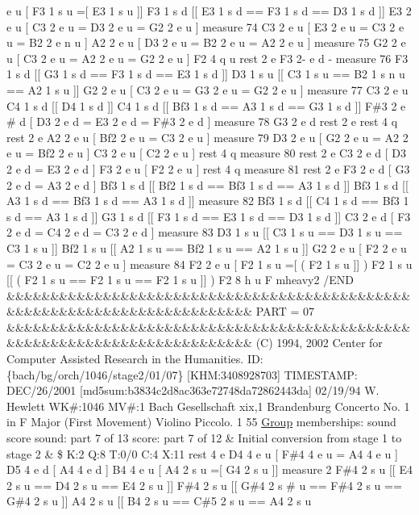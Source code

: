 e u \mbox{[} F3 1 s u =\mbox{[} E3 1 s u \mbox{]}\mbox{]} F3 1 s d \mbox{[}\mbox{[} E3 1 s d == F3 1 s d == D3 1 s d \mbox{]}\mbox{]} E3 2 e u \mbox{[} C3 2 e u = D3 2 e u = G2 2 e u \mbox{]} measure 74 C3 2 e u \mbox{[} E3 2 e u = C3 2 e u = B2 2 e n u \mbox{]} A2 2 e u \mbox{[} D3 2 e u = B2 2 e u = A2 2 e u \mbox{]} measure 75 G2 2 e u \mbox{[} C3 2 e u = A2 2 e u = G2 2 e u \mbox{]} F2 4 q u rest 2 e F3 2-\/ e d -\/ measure 76 F3 1 s d \mbox{[}\mbox{[} G3 1 s d == F3 1 s d == E3 1 s d \mbox{]}\mbox{]} D3 1 s u \mbox{[}\mbox{[} C3 1 s u == B2 1 s n u == A2 1 s u \mbox{]}\mbox{]} G2 2 e u \mbox{[} C3 2 e u = G3 2 e u = G2 2 e u \mbox{]} measure 77 C3 2 e u C4 1 s d \mbox{[}\mbox{[} D4 1 s d \mbox{]}\mbox{]} C4 1 s d \mbox{[}\mbox{[} Bf3 1 s d == A3 1 s d == G3 1 s d \mbox{]}\mbox{]} F\#3 2 e \# d \mbox{[} D3 2 e d = E3 2 e d = F\#3 2 e d \mbox{]} measure 78 G3 2 e d rest 2 e rest 4 q rest 2 e A2 2 e u \mbox{[} Bf2 2 e u = C3 2 e u \mbox{]} measure 79 D3 2 e u \mbox{[} G2 2 e u = A2 2 e u = Bf2 2 e u \mbox{]} C3 2 e u \mbox{[} C2 2 e u \mbox{]} rest 4 q measure 80 rest 2 e C3 2 e d \mbox{[} D3 2 e d = E3 2 e d \mbox{]} F3 2 e u \mbox{[} F2 2 e u \mbox{]} rest 4 q measure 81 rest 2 e F3 2 e d \mbox{[} G3 2 e d = A3 2 e d \mbox{]} Bf3 1 s d \mbox{[}\mbox{[} Bf2 1 s d == Bf3 1 s d == A3 1 s d \mbox{]}\mbox{]} Bf3 1 s d \mbox{[}\mbox{[} A3 1 s d == Bf3 1 s d == A3 1 s d \mbox{]}\mbox{]} measure 82 Bf3 1 s d \mbox{[}\mbox{[} C4 1 s d == Bf3 1 s d == A3 1 s d \mbox{]}\mbox{]} G3 1 s d \mbox{[}\mbox{[} F3 1 s d == E3 1 s d == D3 1 s d \mbox{]}\mbox{]} C3 2 e d \mbox{[} F3 2 e d = C4 2 e d = C3 2 e d \mbox{]} measure 83 D3 1 s u \mbox{[}\mbox{[} C3 1 s u == D3 1 s u == C3 1 s u \mbox{]}\mbox{]} Bf2 1 s u \mbox{[}\mbox{[} A2 1 s u == Bf2 1 s u == A2 1 s u \mbox{]}\mbox{]} G2 2 e u \mbox{[} F2 2 e u = C3 2 e u = C2 2 e u \mbox{]} measure 84 F2 2 e u \mbox{[} F2 1 s u =\mbox{[} ( F2 1 s u \mbox{]}\mbox{]} ) F2 1 s u \mbox{[}\mbox{[} ( F2 1 s u == F2 1 s u == F2 1 s u \mbox{]}\mbox{]} ) F2 8 h u F mheavy2 /\+E\+ND \&\&\&\&\&\&\&\&\&\&\&\&\&\&\&\&\&\&\&\&\&\&\&\&\&\&\&\&\&\&\&\&\&\&\&\&\&\&\&\&\&\&\&\&\&\&\&\&\&\&\&\&\&\&\&\&\&\&\&\&\&\&\&\&\&\&\&\&\&\&\&\&\&\& P\+A\+RT = 07 \&\&\&\&\&\&\&\&\&\&\&\&\&\&\&\&\&\&\&\&\&\&\&\&\&\&\&\&\&\&\&\&\&\&\&\&\&\&\&\&\&\&\&\&\&\&\&\&\&\&\&\&\&\&\&\&\&\&\&\&\&\&\&\&\&\&\&\&\&\&\&\&\&\& (C) 1994, 2002 Center for Computer Assisted Research in the Humanities. ID\+: \{bach/bg/orch/1046/stage2/01/07\} \mbox{[}K\+HM\+:3408928703\mbox{]} T\+I\+M\+E\+S\+T\+A\+MP\+: D\+E\+C/26/2001 \mbox{[}md5sum\+:b3834c2d8ac363e72748da72862443da\mbox{]} 02/19/94 W. Hewlett WK\#\+:1046 MV\#\+:1 Bach Gesellschaft xix,1 Brandenburg Concerto No. 1 in F Major (First Movement) Violino Piccolo. 1 55 \hyperlink{class_group}{Group} memberships\+: sound score sound\+: part 7 of 13 score\+: part 7 of 12 \& Initial conversion from stage 1 to stage 2 \& \$ K\+:2 Q\+:8 T\+:0/0 C\+:4 X\+:11 rest 4 e D4 4 e u \mbox{[} F\#4 4 e u = A4 4 e u \mbox{]} D5 4 e d \mbox{[} A4 4 e d \mbox{]} B4 4 e u \mbox{[} A4 2 s u =\mbox{[} G4 2 s u \mbox{]}\mbox{]} measure 2 F\#4 2 s u \mbox{[}\mbox{[} E4 2 s u == D4 2 s u == E4 2 s u \mbox{]}\mbox{]} F\#4 2 s u \mbox{[}\mbox{[} G\#4 2 s \# u == F\#4 2 s u == G\#4 2 s u \mbox{]}\mbox{]} A4 2 s u \mbox{[}\mbox{[} B4 2 s u == C\#5 2 s u == A4 2 s u 